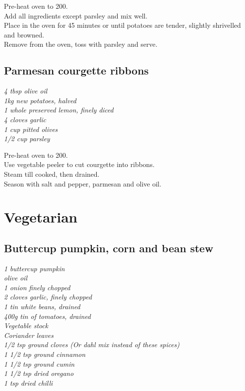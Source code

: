 \documentclass{tufte-book}
\begin{document}
Pre-heat oven to 200\celsius.
\\Add all ingredients except parsley and mix well.
\\Place in the oven for 45 minutes or until potatoes are tender, slightly shrivelled and browned. 
\\Remove from the oven, toss with parsley and serve.


\section{Parmesan courgette ribbons}

\emph{4 tbsp olive oil
\\1kg new potatoes, halved
\\1 whole preserved lemon, finely diced
\\4 cloves garlic
\\1 cup pitted olives
\\1/2 cup parsley
}

Pre-heat oven to 200\celsius.
\\Use vegetable peeler to cut courgette into ribbons.
\\Steam till cooked, then drained.
\\Season with salt and pepper, parmesan and olive oil.

\chapter{Vegetarian}

\section{Buttercup pumpkin, corn and bean stew}

\emph{1 buttercup pumpkin
\\olive oil
\\1 onion finely chopped
\\2 cloves garlic, finely chopped
\\1 tin white beans, drained
\\400g tin of tomatoes, drained
\\Vegetable stock
\\Coriander leaves 
\\1/2 tsp ground cloves  (Or dahl mix instead of these spices)
\\1 1/2 tsp ground cinnamon
\\1 1/2 tsp ground cumin
\\1 1/2 tsp dried oregano
\\1 tsp dried chilli
}
\end{document}
